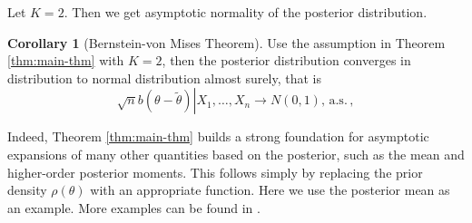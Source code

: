 \documentclass[oneside,english]{amsbook}
\numberwithin{section}{chapter}
\numberwithin{equation}{section}
\numberwithin{figure}{section}
\theoremstyle{plain}
\theoremstyle{plain}
\theoremstyle{definition}
\theoremstyle{plain}
\theoremstyle{plain}
\theoremstyle{remark}
\theoremstyle{definition}
\newtheorem{corollary}{Corollary}
\theoremstyle{definition}
\newcommand{\ascv}{\,\mathrm{a.s.}\,}
\begin{document}
Let $K=2$. Then we get asymptotic normality of the posterior distribution. 
\begin{corollary}[Bernstein-von Mises  Theorem]
Use the assumption in Theorem \ref{thm:main-thm} with $K=2$, then
the posterior distribution converges in distribution to normal distribution
almost surely, that is 
\[
\left.\sqrt{n}b\left(\theta-\tilde{\theta}\right)\right|X_{1},\ldots,X_{n}\rightarrow N(0,1),\ascv,
\]

\end{corollary}
Indeed, Theorem \ref{thm:main-thm} builds a strong foundation for 
asymptotic expansions of many other quantities based on the posterior,
such as the mean and higher-order posterior moments. This follows simply by replacing the prior density $\rho\left(\theta\right)$ with an
appropriate function. Here we use the posterior mean as an example. More
examples can be  found in \cite{johnson1970asymptotic}.
\end{document}
